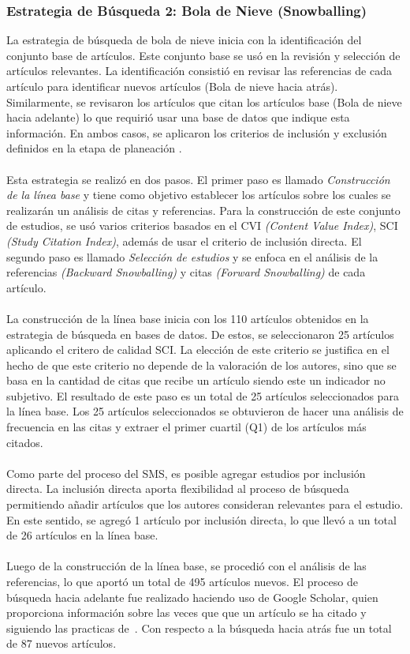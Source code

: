 \subsubsection{Estrategia de Búsqueda 2: Bola de Nieve (Snowballing)}
La estrategia de búsqueda de bola de nieve inicia con la identificación del conjunto base de artículos. Este conjunto base se usó en la revisión y selección de artículos relevantes. La identificación consistió en revisar las referencias de cada artículo para identificar nuevos artículos (Bola de nieve hacia atrás). Similarmente, se revisaron los artículos que citan los artículos base (Bola de nieve hacia adelante) lo que requirió usar una base de datos que indique esta información. En ambos casos, se aplicaron los criterios de inclusión y exclusión definidos en la etapa de planeación \cite{10.1145/2601248.2601268}. \\ \\
Esta estrategia se realizó en dos pasos. El primer paso es llamado \textit{Construcción de la línea base} y tiene como objetivo establecer los artículos sobre los cuales se realizarán un análisis de citas y referencias. Para la construcción de este conjunto de estudios, se usó varios criterios basados en el CVI \textit{(Content Value Index)}, SCI \textit{(Study Citation Index)}, además de usar el criterio de inclusión directa. El segundo paso es llamado \textit{Selección de estudios} y se enfoca en el análisis de la referencias \textit{(Backward Snowballing)} y citas \textit{(Forward Snowballing)} de cada artículo. \\ \\
La construcción de la línea base inicia con los 110 artículos obtenidos en la estrategia de búsqueda en bases de datos. De estos, se seleccionaron 25 artículos aplicando el critero de calidad SCI. La elección de este criterio se justifica en el hecho de que este criterio no depende de la valoración de los autores, sino que se basa en la cantidad de citas que recibe un artículo siendo este un indicador no subjetivo. El resultado de este paso es un total de 25 artículos seleccionados para la línea base. Los 25 artículos seleccionados se obtuvieron de hacer una análisis de frecuencia en las citas y extraer el primer cuartil (Q1) de los artículos más citados.\\ \\
Como parte del proceso del SMS, es posible agregar estudios por inclusión directa. La inclusión directa aporta flexibilidad al proceso de búsqueda permitiendo añadir artículos que los autores consideran relevantes para el estudio. En este sentido, se agregó 1 artículo por inclusión directa, lo que llevó a un total de 26 artículos en la línea base.\\ \\
Luego de la construcción de la línea base, se procedió con el análisis de las referencias, lo que aportó un total de 495 artículos nuevos. El proceso de búsqueda hacia adelante fue realizado haciendo uso de Google Scholar, quien proporciona información sobre las veces que que un artículo se ha citado y siguiendo las practicas de~\cite{8747000}. 
Con respecto a la búsqueda hacia atrás fue un total de 87 nuevos artículos.\\

